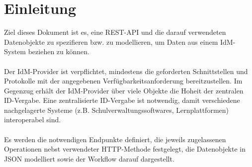 \chapter{Einleitung}
Ziel dieses Dokument ist es, eine REST-API und die darauf verwendeten Datenobjekte zu spezifieren bzw. zu modellieren, um Daten aus einem IdM-System beziehen zu können.\\
\\
Der IdM-Provider ist verpflichtet, mindestens die geforderten Schnittstellen und Protokolle mit der angegebenen Verfügbarkeitsanforderung bereitzustellen. 
Im Gegenzug erhält der IdM-Provider über viele Objekte die Hoheit der zentralen ID-Vergabe. 
Eine zentralisierte ID-Vergabe ist notwendig, damit verschiedene nachgelagerte Systeme (z.B. Schulverwaltungssoftwares, Lernplattformen) interoperabel sind.\\
\\
Es werden die notwendigen Endpunkte definiert, die jeweils zugelassenen Operationen nebst verwendeter HTTP-Methode festgelegt, die Datenobjekte in JSON modelliert sowie der Workflow darauf dargestellt.

